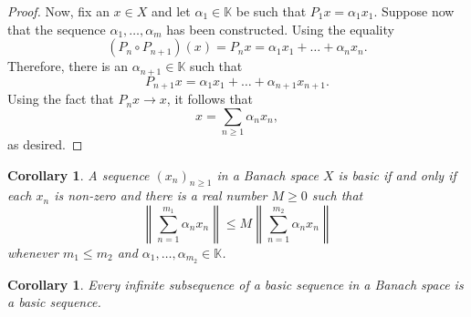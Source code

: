 \documentclass[11pt]{article}
\theoremstyle{thmstyle}
\theoremstyle{defstyle}
\newtheorem{corollary}[theorem]{Corollary}
\newcommand{\R}{\mathbb{R}}
\newcommand{\bbC}{\mathbb{C}}
\newcommand{\K}{\mathbb{K}} %
\renewcommand{\le}{\leqslant}
\renewcommand{\ge}{\geqslant}
\begin{document}
\begin{proof}
	Now, fix an $x\in X$ and let $\alpha_1\in\K$ be such that $P_1x = \alpha_1 x_1$. Suppose now that the sequence $\alpha_1,\dots,\alpha_m$ has been constructed. Using the equality 
	\begin{equation*}
		\left(P_n\circ P_{n + 1}\right)(x) = P_n x = \alpha_1 x_1 + \dots + \alpha_n x_n.
	\end{equation*}
	Therefore, there is an $\alpha_{n + 1}\in\K$ such that 
	\begin{equation*}
		P_{n + 1}x = \alpha_1x_1 + \dots + \alpha_{n + 1}x_{n + 1}.
	\end{equation*}
	Using the fact that $P_nx\to x$, it follows that 
	\begin{equation*}
		x = \sum_{n\ge 1}\alpha_n x_n,
	\end{equation*}
	as desired.
\end{proof}

\begin{corollary}
	A sequence $(x_n)_{n\ge 1}$ in a Banach space $X$ is basic if and only if each $x_n$ is non-zero and there is a real number $M\ge 0$ such that 
	\begin{equation*}
		\left\|\sum_{n = 1}^{m_1}\alpha_n x_n\right\|\le M\left\|\sum_{n = 1}^{m_2} \alpha_n x_n\right\|
	\end{equation*}
	whenever $m_1\le m_2$ and $\alpha_1,\dots,\alpha_{m_2}\in\K$.
\end{corollary}

\begin{corollary}
	Every infinite subsequence of a basic sequence in a Banach space is a basic sequence.
\end{corollary}
\end{document}
